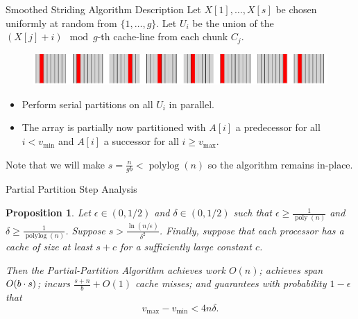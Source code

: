 \documentclass[x11names, svgnames, rgb]{beamer}
\DeclarePairedDelimiter{\paren}{(}{)}
\newcommand{\poly}{\operatorname{poly}}
\newcommand{\polylog}{\operatorname{polylog}}
\newtheorem{proposition}{Proposition}
\begin{document}
\begin{frame}[t]{Smoothed Striding Algorithm Description}
	Let $X[1],\ldots, X[s]$ be chosen uniformly at random from $\{1,\ldots, g\}$. Let $U_i$ be the union of the $(X[j]+i)\mod g$-th cache-line from each chunk $C_j$.
	\begin{figure}
		\includegraphics[width=\linewidth]{imgs/smoothedStridingAlgHighlighted.png}
	\end{figure}
	\begin{itemize}
		\item Perform serial partitions on all $U_i$ in parallel.
		\item The array is partially now partitioned with $A[i]$ a predecessor for all $i < v_{\text{min}}$ and $A[i]$ a successor for all $i \ge v_{\text{max}}$.
	\end{itemize}
	Note that we will make $s = \frac{n}{gb} < \polylog(n)$ so the algorithm remains in-place.
\end{frame}


\begin{frame}[t]{Partial Partition Step Analysis}
\begin{proposition}
  Let $\epsilon \in (0, 1/2)$ and $\delta \in (0, 1/2)$ such that
  $\epsilon \ge \frac{1}{\poly(n)}$ and $\delta \ge
  \frac{1}{\polylog(n)}$. Suppose $s > \frac{\ln
    (n/\epsilon)}{\delta^2}$. Finally, suppose that each processor has
  a cache of size at least $s + c$ for a sufficiently large constant
  $c$.

  Then the Partial-Partition Algorithm achieves work $O(n)$; achieves
  span $O\paren*{b \cdot s}$; incurs $\frac{s+n}{b} + O(1)$ cache
  misses; and guarantees with probability $1 - \epsilon$ that
  $$v_{\text{max}}-v_{\text{min}} < 4 n \delta.$$
\end{proposition}

\end{frame}
\end{document}
